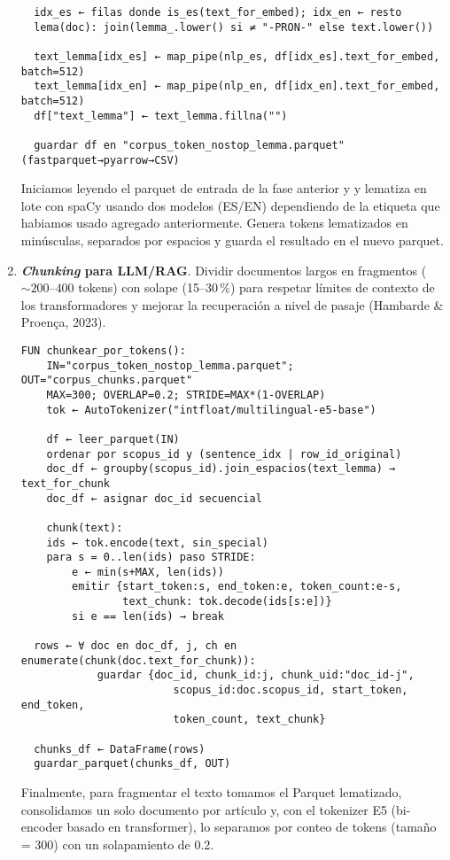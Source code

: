 \begin{enumerate}
\begin{verbatim}
  idx_es ← filas donde is_es(text_for_embed); idx_en ← resto
  lema(doc): join(lemma_.lower() si ≠ "-PRON-" else text.lower())

  text_lemma[idx_es] ← map_pipe(nlp_es, df[idx_es].text_for_embed, batch=512)
  text_lemma[idx_en] ← map_pipe(nlp_en, df[idx_en].text_for_embed, batch=512)
  df["text_lemma"] ← text_lemma.fillna("")

  guardar df en "corpus_token_nostop_lemma.parquet" (fastparquet→pyarrow→CSV)
\end{verbatim}
Iniciamos leyendo el parquet de entrada de la fase anterior y y lematiza en lote con spaCy usando dos modelos (ES/EN) dependiendo de la etiqueta que habiamos usado agregado anteriormente.
Genera  tokens lematizados en minúsculas, separados por espacios y guarda el resultado en el nuevo parquet.

\item \textbf{\textit{Chunking} para LLM/RAG}. Dividir documentos largos en fragmentos (\(\sim 200\text{--}400\) tokens) con solape (15–30\,\%) para respetar 
    límites de contexto de los transformadores y mejorar la recuperación a nivel de pasaje (Hambarde \& Proença, 2023).
    \begin{verbatim}
FUN chunkear_por_tokens():
    IN="corpus_token_nostop_lemma.parquet"; OUT="corpus_chunks.parquet"
    MAX=300; OVERLAP=0.2; STRIDE=MAX*(1-OVERLAP)
    tok ← AutoTokenizer("intfloat/multilingual-e5-base")

    df ← leer_parquet(IN)
    ordenar por scopus_id y (sentence_idx | row_id_original)
    doc_df ← groupby(scopus_id).join_espacios(text_lemma) → text_for_chunk
    doc_df ← asignar doc_id secuencial

    chunk(text):
    ids ← tok.encode(text, sin_special)
    para s = 0..len(ids) paso STRIDE:
        e ← min(s+MAX, len(ids))
        emitir {start_token:s, end_token:e, token_count:e-s,
                text_chunk: tok.decode(ids[s:e])}
        si e == len(ids) → break

  rows ← ∀ doc en doc_df, j, ch en enumerate(chunk(doc.text_for_chunk)):
            guardar {doc_id, chunk_id:j, chunk_uid:"doc_id-j",
                        scopus_id:doc.scopus_id, start_token, end_token,
                        token_count, text_chunk}

  chunks_df ← DataFrame(rows)
  guardar_parquet(chunks_df, OUT)   
\end{verbatim}
Finalmente, para fragmentar el texto tomamos el Parquet lematizado, consolidamos un solo documento por artículo 
y, con el tokenizer E5 (bi-encoder basado en transformer), lo separamos por conteo de tokens (tamaño = 300) con un solapamiento de 0.2.
\end{enumerate}
